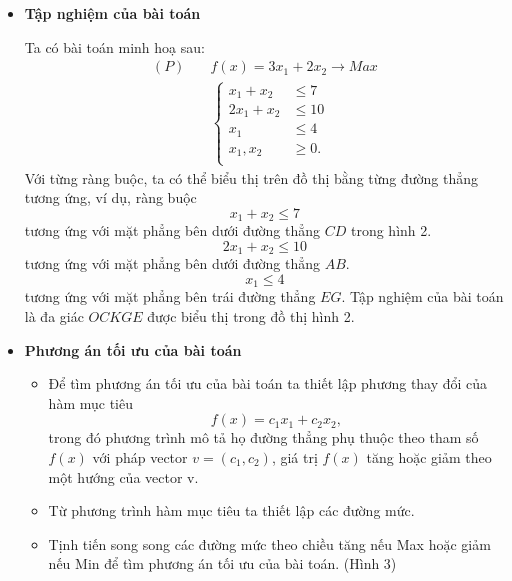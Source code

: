 \documentclass[12pt,a4paper]{report}
\begin{document}
\begin{itemize}
\item \textbf{Tập nghiệm của bài toán}

Ta có bài toán minh hoạ sau:
\begin{equation}
	\begin{split}
	(P) \quad & f(x) = 3x_1 + 2x_2 \longrightarrow Max \\
		& \left\{\begin{split}
		x_1 + x_2 &\leq 7 \\
		2x_1 + x_2 &\leq 10 \\
		x_1 &\leq 4 \\
		x_1, x_2 &\geq 0. \\
		\end{split}\right.    
	\end{split}
\end{equation}
Với từng ràng buộc, ta có thể biểu thị trên đồ thị bằng từng đường thẳng tương ứng, ví dụ, ràng buộc
\begin{equation*}
x_1 + x_2 \leq 7
\end{equation*}
tương ứng với mặt phẳng bên dưới đường thẳng $CD$ trong hình 2.
\begin{equation*}
	2x_1 + x_2 \leq 10
\end{equation*}
tương ứng với mặt phẳng bên dưới đường thẳng $AB$.
\begin{equation*}
	x_1 \leq 4
	\end{equation*}
tương ứng với mặt phẳng bên trái đường thẳng $EG$. Tập nghiệm của bài toán là đa giác $OCKGE$ được biểu thị trong đồ thị hình 2.

\item \textbf{Phương án tối ưu của bài toán}
\begin{itemize}
\item Để tìm phương án tối ưu của bài toán ta thiết lập phương thay đổi của hàm mục tiêu
\begin{equation*}
f(x)=c_1x_1+c_2x_2,
\end{equation*}
trong đó phương trình mô tả họ đường thẳng phụ thuộc theo tham số $f(x)$ với pháp vector $v=(c_1,c_2)$, giá trị $f(x)$ tăng hoặc giảm theo một hướng của vector v.
\item Từ phương trình hàm mục tiêu ta thiết lập các đường mức.
\item Tịnh tiến song song các đường mức theo chiều tăng nếu Max hoặc giảm nếu Min để tìm phương án tối ưu của bài toán. (Hình 3)
\end{itemize}


\end{itemize}
\end{document}
